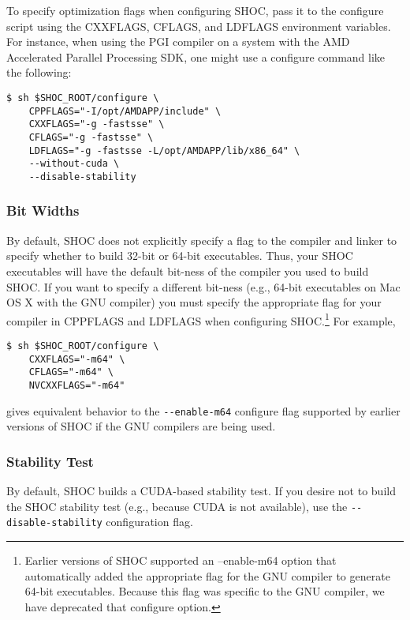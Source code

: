 \documentclass[11pt]{article}
\begin{document}
To specify optimization flags when configuring SHOC, pass it to the
configure script using the CXXFLAGS, CFLAGS, and LDFLAGS environment variables.
For instance, when using the PGI compiler on a system with the 
AMD Accelerated Parallel Processing SDK, one might use a configure command 
like the following:

\begin{Verbatim}[frame=single]
$ sh $SHOC_ROOT/configure \
    CPPFLAGS="-I/opt/AMDAPP/include" \
    CXXFLAGS="-g -fastsse" \
    CFLAGS="-g -fastsse" \
    LDFLAGS="-g -fastsse -L/opt/AMDAPP/lib/x86_64" \
    --without-cuda \
    --disable-stability
\end{Verbatim}


\subsubsection{Bit Widths}\label{sec:confbitwidth}

By default, SHOC does not explicitly specify a flag to the compiler and 
linker to specify whether to build 32-bit or 64-bit executables.
Thus, your SHOC executables will have the default bit-ness of the compiler 
you used to build SHOC.
If you want to specify a different bit-ness (e.g., 64-bit executables on 
Mac OS X with the GNU compiler) you must specify the appropriate flag
for your compiler in CPPFLAGS and LDFLAGS when configuring 
SHOC.\footnote{Earlier versions of SHOC supported an --enable-m64 option 
that automatically added the appropriate flag for the GNU compiler to generate
64-bit executables.  Because this flag was specific to the GNU compiler, we have
deprecated that configure option.}
For example,
\begin{Verbatim}[frame=single]
$ sh $SHOC_ROOT/configure \
    CXXFLAGS="-m64" \
    CFLAGS="-m64" \
    NVCXXFLAGS="-m64"
\end{Verbatim}
\noindent gives equivalent behavior to the \verb+--enable-m64+ configure flag
supported by earlier versions of SHOC if the GNU compilers are being used.

\subsubsection{Stability Test}\label{sec:confstability}

By default, SHOC builds a CUDA-based stability test.
If you desire not to build the SHOC stability test (e.g., because CUDA is
not available), use the \verb+--disable-stability+ configuration flag.
\end{document}
